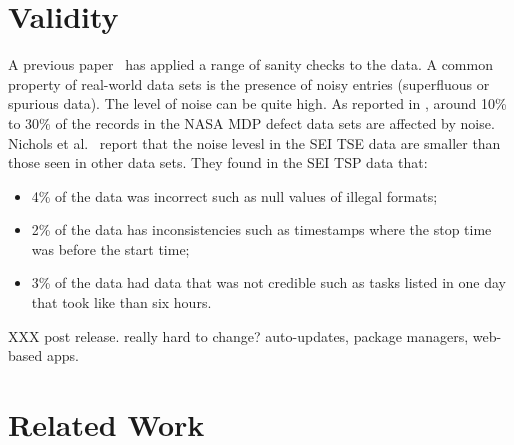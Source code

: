 \documentclass{sig-alternate}
\newcommand{\bi}{\begin{itemize}[leftmargin=0.4cm]}
\newcommand{\ei}{\end{itemize}}
\begin{document}
 


 

\section{Validity} 
A previous paper~\cite{shirai14} has applied a range of sanity checks to the data.
A common property of real-world data sets is the presence
of noisy entries (superfluous  or spurious data). 
The level of noise can be quite high. As reported
in \cite{shepperd12}, around
10\% to 30\%
of the records in the NASA MDP defect data sets are
affected by noise. Nichols et al.~\cite{shirai14}  report that
the noise levesl in the SEI TSE data are smaller than those seen
in other data sets. They found in the SEI TSP data that:\bi 
\item
4\% of the data was incorrect such as  null values of illegal formats;
\item  2\% of the data has inconsistencies such as timestamps
where the stop time was before the start time;
\item 3\% of the data had data that was not credible
such as tasks listed in one day that took like than six hours.
\ei 


XXX post release. really hard to change? auto-updates, package managers, web-based apps. 
 
\section{Related Work}
\end{document}
